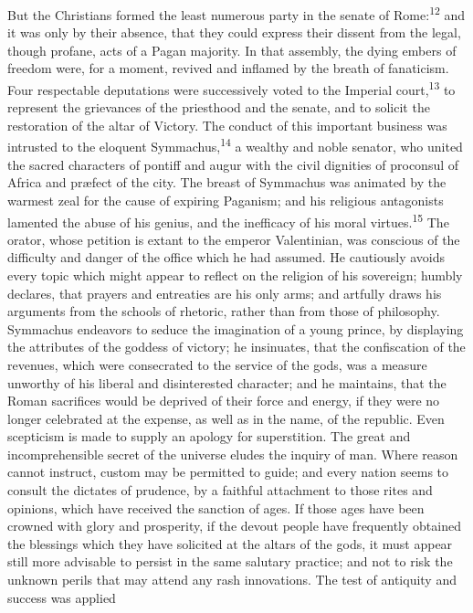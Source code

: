 But the Christians formed the least numerous party in the senate
of Rome:\textsuperscript{12} and it was only by their absence, that they could
express their dissent from the legal, though profane, acts of a
Pagan majority. In that assembly, the dying embers of freedom
were, for a moment, revived and inflamed by the breath of
fanaticism. Four respectable deputations were successively voted
to the Imperial court,\textsuperscript{13} to represent the grievances of the
priesthood and the senate, and to solicit the restoration of the
altar of Victory. The conduct of this important business was
intrusted to the eloquent Symmachus,\textsuperscript{14} a wealthy and noble
senator, who united the sacred characters of pontiff and augur
with the civil dignities of proconsul of Africa and præfect of
the city. The breast of Symmachus was animated by the warmest
zeal for the cause of expiring Paganism; and his religious
antagonists lamented the abuse of his genius, and the inefficacy
of his moral virtues.\textsuperscript{15} The orator, whose petition is extant to
the emperor Valentinian, was conscious of the difficulty and
danger of the office which he had assumed. He cautiously avoids
every topic which might appear to reflect on the religion of his
sovereign; humbly declares, that prayers and entreaties are his
only arms; and artfully draws his arguments from the schools of
rhetoric, rather than from those of philosophy. Symmachus
endeavors to seduce the imagination of a young prince, by
displaying the attributes of the goddess of victory; he
insinuates, that the confiscation of the revenues, which were
consecrated to the service of the gods, was a measure unworthy of
his liberal and disinterested character; and he maintains, that
the Roman sacrifices would be deprived of their force and energy,
if they were no longer celebrated at the expense, as well as in
the name, of the republic. Even scepticism is made to supply an
apology for superstition. The great and incomprehensible secret
of the universe eludes the inquiry of man. Where reason cannot
instruct, custom may be permitted to guide; and every nation
seems to consult the dictates of prudence, by a faithful
attachment to those rites and opinions, which have received the
sanction of ages. If those ages have been crowned with glory and
prosperity, if the devout people have frequently obtained the
blessings which they have solicited at the altars of the gods, it
must appear still more advisable to persist in the same salutary
practice; and not to risk the unknown perils that may attend any
rash innovations. The test of antiquity and success was applied
